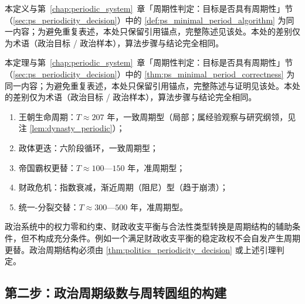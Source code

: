 \begin{definition}[政治最小正周期算法]\label{def:politics_minimal_period_algorithm}
本定义与第~\ref{chap:periodic_system}~章「周期性判定：目标是否具有周期性」节（\cref{sec:ps_periodicity_decision}）中的 \cref{def:ps_minimal_period_algorithm} 为同一内容；为避免重复表述，本处只保留引用锚点，完整陈述见该处。本处的差别仅为术语（政治目标 / 政治样本），算法步骤与结论完全相同。
\end{definition}

\begin{theorem}[政治最小正周期算法的正确性]\label{thm:politics_minimal_period_correctness}
本定理与第~\ref{chap:periodic_system}~章「周期性判定：目标是否具有周期性」节（\cref{sec:ps_periodicity_decision}）中的 \cref{thm:ps_minimal_period_correctness} 为同一内容；为避免重复表述，本处只保留引用锚点，完整陈述与证明见该处。本处的差别仅为术语（政治目标 / 政治样本），算法步骤与结论完全相同。
\end{theorem}

\begin{example}[政治周期判定实例]\label{ex:politics_periodic_examples}
\begin{enumerate}[label=(\roman*)]
    \item 王朝生命周期：$T\approx207$ 年，一致周期型（局部；属经验观察与研究纲领，见注 \ref{lem:dynasty_periodic}）；
    \item 政体更迭：六阶段循环，一致周期型；
    \item 帝国霸权更替：$T\approx100$—$150$ 年，准周期型；
    \item 财政危机：指数衰减，渐近周期（阻尼）型（趋于崩溃）；
    \item 统一-分裂交替：$T\approx300$—$500$ 年，准周期型。
\end{enumerate}
\end{example}

\begin{remark}[守恒量不保证周期]\label{rem:politics_invariant_not_period}
政治系统中的权力零和约束、财政收支平衡与合法性类型转换是周期结构的辅助条件，但不构成充分条件。例如一个满足财政收支平衡的稳定政权不会自发产生周期更替。政治周期结构必须由 \cref{thm:politics_periodicity_decision} 或上述引理判定。
\end{remark}

\subsection{第二步：政治周期级数与周转圆组的构建}

